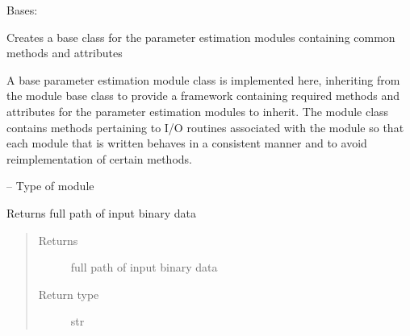 \documentclass[letterpaper,10pt,english]{sphinxmanual}
\begin{document}
\begin{fulllineitems}
\label{\detokenize{MouseReferenceManual:Modules.Base.ParameterEstimationModuleBaseClass}}
Bases: {\hyperref[\detokenize{MouseReferenceManual:Modules.Base.ModuleBaseClass}]{}}

Creates a base class for the parameter estimation modules containing common methods and attributes

A base parameter estimation module class is implemented here, inheriting from the module base class to provide a framework containing required methods and attributes for the parameter estimation modules to inherit. The module class contains methods pertaining to I/O routines associated with the module so that each module that is written behaves in a consistent manner and to avoid reimplementation of certain methods.

\begin{fulllineitems}
\label{\detokenize{MouseReferenceManual:Modules.Base.ParameterEstimationModuleBaseClass.type}}
 -- Type of module

\end{fulllineitems}


\begin{fulllineitems}
\label{\detokenize{MouseReferenceManual:Modules.Base.ParameterEstimationModuleBaseClass.inputFileName}}
Returns full path of input binary data
\begin{quote}\begin{description}
\item[{Returns}] \leavevmode
full path of input binary data

\item[{Return type}] \leavevmode
str

\end{description}\end{quote}

\end{fulllineitems}


\end{fulllineitems}
\end{document}
